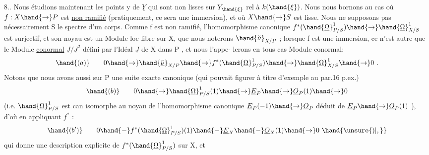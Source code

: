 
8.. Nous étudions maintenant les points  y de $\underline{Y}$ qui sont non lisses
sur $Y_{\hand{\xi}}$ rel à $k(\hand{\xi})$. Nous nous  bornons au cas où  $f:X\hand{\to} P$  est \uline{non ramifié}
(pratiquement, ce sera une immersion), et où $X\hand{\to} S$ est lisse.  Nous ne
supposons pas nécessairement S le spectre d'un corps.  
 Comme
f  est non ramifié, l'homomorphisme canonique   $f^*(\hand{\underline{\Omega}}^1_{P/S})\hand{\to}\hand{\underline{\Omega}}^1_{X/S}$
est surjectif, et son noyau est un Module loc libre sur X, que nous
noterons  $\hand{\check{\nu}}_{X/P}$ ; lorsque f est une immersion, ce n'est autre que le
Module \uline{conormal}  $\underline{J}/\underline{J}^2$  défini par l'Idéal $\underline{J}$ de X dans P , et nous l'appe-%
lerons en tous cas Module conormal:
\[ \hand{(a)} \qquad 0\hand{\to}\hand{\check{\underline{\nu}}}_{X/P}\hand{\to} f^*(\hand{\underline{\Omega}}^1_{P/S})\hand{\to}\hand{\underline{\Omega}}^1_{X/S}\hand{\to} 0 \ . \]
Notons que nous avons aussi sur  P  une suite exacte canonique
(qui pouvait figurer à titre d'exemple au par.16 p.ex.)
\[ \hand{(b)} \qquad 0\hand{\to}\hand{\underline{\Omega}}^1_{P/S}(1)\hand{\to}\underline{E}_P\hand{\to}\underline{O}_P(1)\hand{\to} 0 \]
(i.e. $\hand{\underline{\Omega}}^1_{P/S}$ est can isomorphe au noyau de l'homomorphisme canonique
$\underline{E}_P(-1)\hand{\to}\underline{O}_P$  déduit de $\underline{E}_P\hand{\to}\underline{O}_P(1)$ ), d'où en appliquant $f^*$ :
\[ \hand{(b')} \qquad 0 \hand{-} f^*(\hand{\underline{\Omega}}^1_{P/S})(1) \hand{-} \underline{E}_X \hand{-} \underline{O}_X(1)\hand{\to} 0 \ \hand{\unsure{)|,}} \]
qui donne une description explicite de  $f^*(\hand{\underline{\Omega}}^1_{P/S})$   sur X, et

